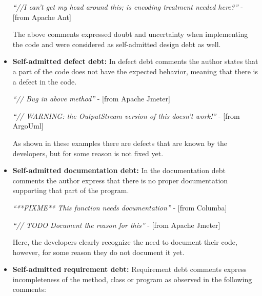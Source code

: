 \begin{itemize}
\begin{displayquote}
      \vspace{1mm}

      \textit{``//I can't get my head around this; is encoding treatment needed here?''} - [from Apache Ant]
  \end{displayquote}
  \vspace{1mm}

The above comments expressed doubt and uncertainty when implementing the code and were considered as self-admitted design debt as well.

\item \textbf{Self-admitted defect debt:} In defect debt comments the author states that a part of the code does not have the expected behavior, meaning that there is a defect in the code. 
  
  \vspace{1mm}
  \begin{displayquote}
      \textit{``// Bug in above method''} - [from Apache Jmeter]

      \vspace{1mm}

      \textit{``// WARNING: the OutputStream version of this doesn't work!''} - [from ArgoUml]
  \end{displayquote}
  \vspace{1mm}
  
As shown in these examples there are defects that are known by the developers, but for some reason is not fixed yet. 

  \item \textbf{Self-admitted documentation debt:} In the documentation debt comments the author express that there is no proper documentation supporting that part of the program.
  
  \vspace{1mm}
  \begin{displayquote}
    \textit{``**FIXME** This function needs documentation''} - [from Columba]
    
    \vspace{1mm}
    
    \textit{``// TODO Document the reason for this''} - [from Apache Jmeter]
  \end{displayquote}
  \vspace{1mm}
  
  Here, the developers clearly recognize the need to document their code, however, for some reason they do not document it yet.
  
  \item \textbf{Self-admitted requirement debt:} Requirement debt comments express incompleteness of the method, class or program as observed in the following comments:
  

\end{itemize}
